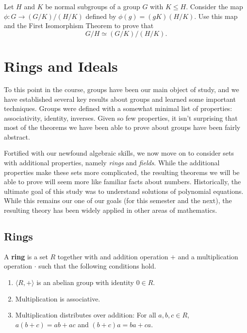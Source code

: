 \begin{problem}
Let \(H\) and \(K\) be normal subgroups of a group \(G\) with \(K \leq H\). Consider the map \(\phi : G \longrightarrow (G/K)/(H/K)\) defined by \(\phi(g) = (gK)(H/K)\). Use this map and the First Isomorphism Theorem to prove that \[G/H \simeq (G/K)/(H/K).\]
\end{problem}

\chapter{Rings and Ideals}
To this point in the course, groups have been our main object of study, and we have established several key results about groups and learned some important techniques. Groups were defined with a somewhat minimal list of properties: associativity, identity, inverses. Given so few properties, it isn't surprising that most of the theorems we have been able to prove about groups have been fairly abstract.

Fortified with our newfound algebraic skills, we now move on to consider sets with additional properties, namely \emph{rings} and \emph{fields}. While the additional properties make these sets more complicated, the resulting theorems we will be able to prove will seem more like familiar facts about numbers. Historically, the ultimate goal of this study was to understand solutions of polynomial equations. While this remains our one of our goals (for this semester and the next), the resulting theory has been widely applied in other areas of mathematics.

\section{Rings}

\begin{definition}
A \textbf{ring} is a set \(R\) together with and addition operation \(+\) and a multiplication operation \(\cdot\) such that the following conditions hold.
\begin{enumerate}
  \item \(\langle  R, + \rangle \) is an abelian group with identity \(0 \in R\).
  \item Multiplication is associative.
  \item Multiplication distributes over addition: For all \(a,b,c\in R\), \(a(b+c)=ab+ac\) and \((b+c)a=ba+ca\).
\end{enumerate}
\end{definition}

